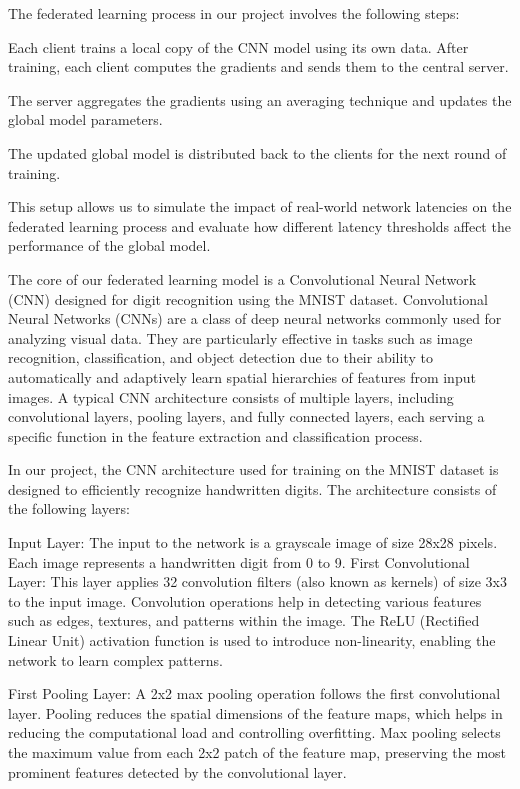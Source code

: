 \documentclass[conference]{IEEEtran}
\begin{document}
The federated learning process in our project involves the following steps:

Each client trains a local copy of the CNN model using its own data.
After training, each client computes the gradients and sends them to the central server.

The server aggregates the gradients using an averaging technique and updates the global model parameters.

The updated global model is distributed back to the clients for the next round of training.

This setup allows us to simulate the impact of real-world network latencies on the federated learning process and evaluate how different latency thresholds affect the performance of the global model.

The core of our federated learning model is a Convolutional Neural Network (CNN) designed for digit recognition using the MNIST dataset. Convolutional Neural Networks (CNNs) are a class of deep neural networks commonly used for analyzing visual data. They are particularly effective in tasks such as image recognition, classification, and object detection due to their ability to automatically and adaptively learn spatial hierarchies of features from input images. A typical CNN architecture consists of multiple layers, including convolutional layers, pooling layers, and fully connected layers, each serving a specific function in the feature extraction and classification process.

In our project, the CNN architecture used for training on the MNIST dataset is designed to efficiently recognize handwritten digits. The architecture consists of the following layers:

Input Layer: The input to the network is a grayscale image of size 28x28 pixels. Each image represents a handwritten digit from 0 to 9.
First Convolutional Layer: This layer applies 32 convolution filters (also known as kernels) of size 3x3 to the input image. Convolution operations help in detecting various features such as edges, textures, and patterns within the image. The ReLU (Rectified Linear Unit) activation function is used to introduce non-linearity, enabling the network to learn complex patterns.

First Pooling Layer: A 2x2 max pooling operation follows the first convolutional layer. Pooling reduces the spatial dimensions of the feature maps, which helps in reducing the computational load and controlling overfitting. Max pooling selects the maximum value from each 2x2 patch of the feature map, preserving the most prominent features detected by the convolutional layer.
\end{document}
